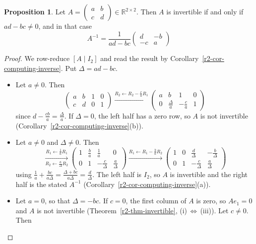\documentclass[12pt]{article}
\newcommand{\R}{\mathbb R}
\theoremstyle{definition}
\newtheorem{proposition}[theorem]{Proposition}
\begin{document}
\begin{proposition}\label{r2-prop-inverse-2x2}
Let \(A=\begin{pmatrix}a&b\\c&d\end{pmatrix}\in\R^{2\times2}\). Then \(A\) is invertible if and only if
\(ad-bc\ne0\), and in that case
\[
A^{-1}=\frac1{ad-bc}\begin{pmatrix}d&-b\\-c&a\end{pmatrix}
\]
\end{proposition}
\begin{proof}
We row-reduce \([A\mid I_2]\) and read the result by Corollary~\ref{r2-cor-computing-inverse}. Put \(\Delta=ad-bc\).
\begin{itemize}
\item Let \(a\ne0\). Then
\[
\left(\begin{array}{cc|cc}a&b&1&0\\c&d&0&1\end{array}\right)
\xrightarrow{R_2\leftarrow R_2-\frac caR_1}
\left(\begin{array}{cc|cc}a&b&1&0\\0&\frac\Delta a&-\frac ca&1\end{array}\right)
\]
since \(d-\frac{cb}a=\frac\Delta a\). If \(\Delta=0\), the left half has a zero row, so \(A\) is not invertible
(Corollary~\ref{r2-cor-computing-inverse}(b)).
\item Let \(a\ne0\) and \(\Delta\ne0\). Then
\[
\xrightarrow[R_2\leftarrow\frac a\Delta R_2]{R_1\leftarrow\frac1aR_1}
\left(\begin{array}{cc|cc}1&\frac ba&\frac1a&0\\0&1&-\frac c\Delta&\frac a\Delta\end{array}\right)
\xrightarrow{R_1\leftarrow R_1-\frac baR_2}
\left(\begin{array}{cc|cc}1&0&\frac d\Delta&-\frac b\Delta\\0&1&-\frac c\Delta&\frac a\Delta\end{array}\right)
\]
using \(\frac1a+\frac{bc}{a\Delta}=\frac{\Delta+bc}{a\Delta}=\frac d\Delta\). The left half is \(I_2\), so \(A\) is
invertible and the right half is the stated \(A^{-1}\) (Corollary~\ref{r2-cor-computing-inverse}(a)).
\item Let \(a=0\), so that \(\Delta=-bc\). If \(c=0\), the first column of \(A\) is zero, so \(Ae_1=0\) and \(A\) is not
invertible (Theorem~\ref{r2-thm-invertible}, (i)\,\(\Leftrightarrow\)\,(iii)). Let \(c\ne0\). Then

\end{itemize}
\end{proof}
\end{document}
